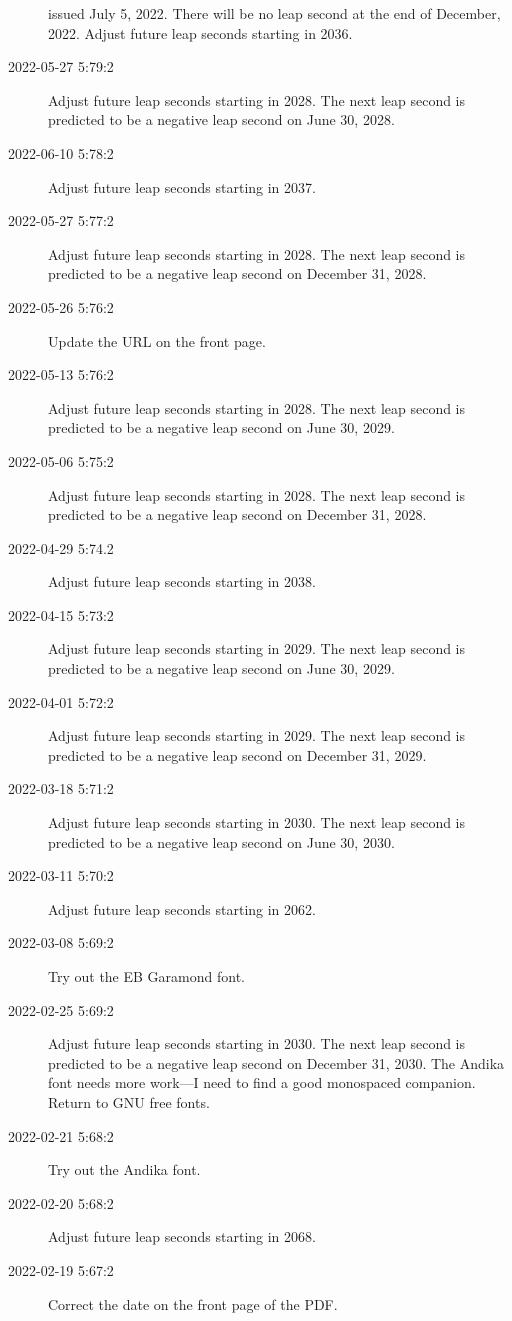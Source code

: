 \documentclass[letterpaper,twoside]{article}
\begin{document}
\begin{description}
  issued July 5, 2022.
  There will be no leap second at the end of December, 2022.
  Adjust future leap seconds starting in 2036.
\item[2022-05-27 5:79:2]Adjust future leap seconds starting in 2028.
  The next leap second is predicted to be a negative leap second
  on June 30, 2028.
\item[2022-06-10 5:78:2]Adjust future leap seconds starting in 2037.
\item[2022-05-27 5:77:2]Adjust future leap seconds starting in 2028.
  The next leap second is predicted to be a negative leap second
  on December 31, 2028.
\item[2022-05-26 5:76:2]Update the URL on the front page.
\item[2022-05-13 5:76:2]Adjust future leap seconds starting in 2028.
  The next leap second is predicted to be a negative leap second
  on June 30, 2029.
\item[2022-05-06 5:75:2]Adjust future leap seconds starting in 2028.
  The next leap second is predicted to be a negative leap second
  on December 31, 2028.
\item[2022-04-29 5:74.2]Adjust future leap seconds starting in 2038.
\item[2022-04-15 5:73:2]Adjust future leap seconds starting in 2029.
  The next leap second is predicted to be a negative leap second
  on June 30, 2029.
\item[2022-04-01 5:72:2]Adjust future leap seconds starting in 2029.
  The next leap second is predicted to be a negative leap second
  on December 31, 2029.
\item[2022-03-18 5:71:2]Adjust future leap seconds starting in 2030.
  The next leap second is predicted to be a negative leap second
  on June 30, 2030.
\item[2022-03-11 5:70:2]Adjust future leap seconds starting in 2062.
\item[2022-03-08 5:69:2]Try out the EB Garamond font.
\item[2022-02-25 5:69:2]Adjust future leap seconds starting in 2030.
  The next leap second is predicted to be a negative leap second
  on December 31, 2030.  The Andika font needs more work---I need to
  find a good monospaced companion.  Return to GNU free fonts.
\item[2022-02-21 5:68:2]Try out the Andika font.
\item[2022-02-20 5:68:2]Adjust future leap seconds starting in 2068.
\item[2022-02-19 5:67:2]Correct the date on the front page of the PDF.

\end{description}
\end{document}
